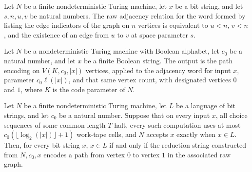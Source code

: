 \begin{lemma}
\label{Complexity.PathHard.rawEdge_adjWordE}
\leanok
{}
Let $N$ be a finite nondeterministic Turing machine, let $x$ be a bit string, and let
$s,n,u,v$ be natural numbers. The raw adjacency relation for the word formed by listing
the edge indicators of the graph on $n$ vertices is equivalent to $u<n$, $v<n$, and the
existence of an edge from $u$ to $v$ at space parameter $s$.
\end{lemma}

\begin{definition}
\label{Complexity.PathHard.red}
\leanok
{}
Let $N$ be a nondeterministic Turing machine with Boolean alphabet, let $c_0$ be a
natural number, and let $x$ be a finite Boolean string. The output is the path encoding
on $V(K,c_0,|x|)$ vertices, applied to the adjacency word for input $x$, parameter
$c_0\ell(|x|)$, and that same vertex count, with designated vertices $0$ and $1$, where
$K$ is the code parameter of $N$.
\end{definition}

\begin{theorem}
\label{Complexity.PathHard.red_mem_iff}
\leanok
{}
Let $N$ be a finite nondeterministic Turing machine, let $L$ be a language of bit
strings, and let $c_0$ be a natural number. Suppose that on every input $x$, all choice
sequences of some common length $T$ halt, every such computation uses at most
$c_0(\lfloor\log_2(|x|)\rfloor+1)$ work-tape cells, and $N$ accepts $x$ exactly when
$x\in L$. Then, for every bit string $x$, $x\in L$ if and only if the reduction string
constructed from $N,c_0,x$ encodes a path from vertex $0$ to vertex $1$ in the
associated raw graph.
\end{theorem}

